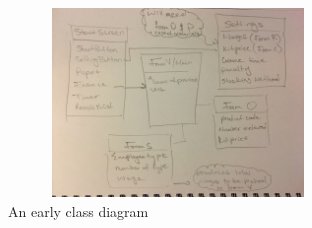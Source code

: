 \begin{figure}[!h]
\begin{center}
\includegraphics[width=9cm, height=5cm]{figures/class}
\end{center}
\caption{An early class diagram}
\label{fig:class}
\end{figure}
